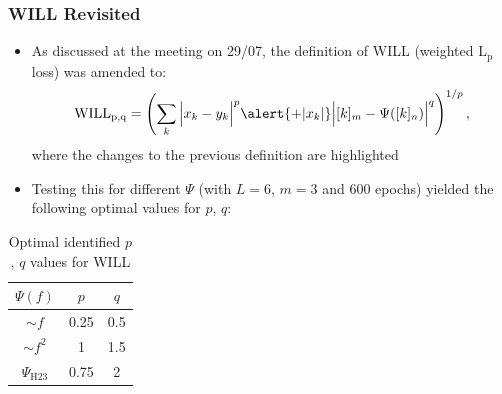 \documentclass{beamer}
\begin{document}
\begin{frame}
\frametitle{WILL Revisited}
\begin{itemize}
\item As discussed at the meeting on 29/07, the definition of \alert{WILL} (weighted L$_\text{p}$ loss) was amended to: 
\begin{equation}
\text{WILL}_\text{p,q} =  \left( \sum_k \Big|x_k -y_k \Big|^p \alert{+ |x_k|} \Big|[k]_m - \Psi([k]_n) \Big|^q \right)^{1/p},
\end{equation}
where the changes to the previous definition are highlighted
\item Testing this for different $\Psi$ (with $L=6$, $m=3$ and 600 epochs) yielded the following optimal values for $p$, $q$:
\end{itemize}
\begin{table}
\centering 
\begin{tabular}{c|c| c}
$\Psi(f)$ & $p$ & $q$ \\ \hline 
$\sim f$ & 0.25 & 0.5  \\
$\sim  f^2$ & 1 & 1.5  \\
$\Psi_{\text{H23}}$ & 0.75 & 2  \\
\end{tabular}
\caption{Optimal identified $p$, $q$ values for WILL}
\end{table}
\end{frame}
\end{document}
